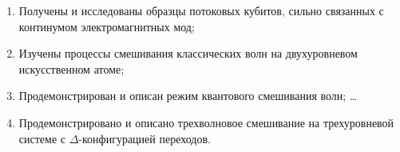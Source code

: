 \begin{enumerate}
  \item Получены и исследованы образцы потоковых кубитов, сильно связанных с континумом электромагнитных мод;
  \item Изучены процессы смешивания классических волн на двухуровневом искусственном атоме;
  \item Продемонстрирован и описан режим квантового смешивания волн; \ldots
  \item Продемонстрировано и описано трехволновое смешивание на трехуровневой системе с $\Delta$-конфигурацией переходов. 
\end{enumerate}
